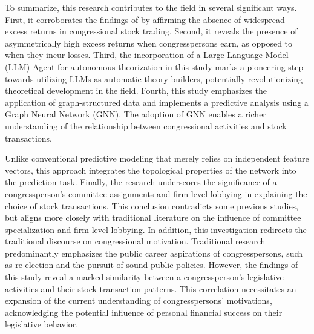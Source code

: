 \documentclass[15pt,letterpaper]{article}
\begin{document}
To summarize, this research contributes to the field in several significant ways.
First, it corroborates the findings of \cite{eg13} by affirming the absence of widespread excess returns in congressional stock trading.
Second, it reveals the presence of asymmetrically high excess returns when congresspersons earn, as opposed to when they incur losses. 
Third, the incorporation of a Large Language Model (LLM) Agent for autonomous theorization in this study marks a pioneering step towards utilizing LLMs as automatic theory builders, potentially revolutionizing theoretical development in the field.
Fourth, this study emphasizes the application of graph-structured data and implements a predictive analysis using a Graph Neural Network (GNN). The adoption of GNN enables a richer understanding of the relationship between congressional activities and stock transactions. 

Unlike conventional predictive modeling that merely relies on independent feature vectors, this approach integrates the topological properties of the network into the prediction task.
Finally, the research underscores the significance of a congressperson's committee assignments and firm-level lobbying in explaining the choice of stock transactions. This conclusion contradicts some previous studies, but aligns more closely with traditional literature on the influence of committee specialization and firm-level lobbying.
In addition, this investigation redirects the traditional discourse on congressional motivation. Traditional research predominantly emphasizes the public career aspirations of congresspersons, such as re-election and the pursuit of sound public policies. However, the findings of this study reveal a marked similarity between a congressperson's legislative activities and their stock transaction patterns. This correlation necessitates an expansion of the current understanding of congresspersons' motivations, acknowledging the potential influence of personal financial success on their legislative behavior.


\end{document}
